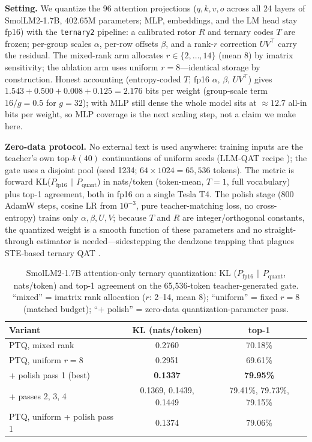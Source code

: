 \documentclass{article}
\begin{document}
\textbf{Setting.} We quantize the 96 attention projections ($q,k,v,o$
across all 24 layers of SmolLM2-1.7B, $402.65$M parameters; MLP,
embeddings, and the LM head stay fp16) with the \texttt{ternary2}
pipeline: a calibrated rotor $R$ and ternary codes $T$ are frozen;
per-group scales $\alpha$, per-row offsets $\beta$, and a rank-$r$
correction $UV^{\top}$ carry the residual. The mixed-rank arm allocates
$r\in\{2,\dots,14\}$ (mean $8$) by imatrix sensitivity; the ablation arm
uses uniform $r=8$---identical storage by construction. Honest
accounting (entropy-coded $T$; fp16 $\alpha$, $\beta$, $UV^{\top}$) gives
$1.543 + 0.500 + 0.008 + 0.125 = \mathbf{2.176}$ bits per weight
(group-scale term $16/g=0.5$ for $g{=}32$); with MLP still dense the
whole model sits at $\approx 12.7$ all-in bits per weight, so MLP
coverage is the next scaling step, not a claim we make here.

\textbf{Zero-data protocol.} No external text is used anywhere:
training inputs are the teacher's own top-$k(40)$ continuations of
uniform seeds (LLM-QAT recipe \citep{liu2024llmqat}); the gate uses a
disjoint pool (seed 1234; $64\times1024 = 65{,}536$ tokens). The metric
is forward KL($P_{\mathrm{fp16}}\|P_{\mathrm{quant}}$) in nats/token
(token-mean, $T{=}1$, full vocabulary) plus top-1 agreement, both in
fp16 on a single Tesla T4. The polish stage (800 AdamW steps, cosine LR
from $10^{-3}$, pure teacher-matching loss, no cross-entropy) trains
only $\alpha,\beta,U,V$; because $T$ and $R$ are integer/orthogonal
constants, the quantized weight is a smooth function of these
parameters and no straight-through estimator is needed---sidestepping
the deadzone trapping that plagues STE-based ternary QAT
\citep{huang2025tequila}.

\begin{table}[t]
\centering\small
\caption{SmolLM2-1.7B attention-only ternary quantization: KL
($P_{\mathrm{fp16}}\|P_{\mathrm{quant}}$, nats/token) and top-1 agreement
on the 65,536-token teacher-generated gate. ``mixed'' = imatrix rank
allocation ($r$: 2--14, mean 8); ``uniform'' = fixed $r=8$ (matched
budget); ``+ polish'' = zero-data quantization-parameter pass.}
\label{tab:klgate}
\begin{tabular}{lcc}
\toprule
Variant & KL (nats/token) & top-1 \\
\midrule
PTQ, mixed rank & 0.2760 & 70.18\% \\
PTQ, uniform $r{=}8$ & 0.2951 & 69.61\% \\
\quad + polish pass 1 (best) & \textbf{0.1337} & \textbf{79.95\%} \\
\quad + passes 2, 3, 4 & 0.1369, 0.1439, 0.1449 & 79.41\%, 79.73\%, 79.15\% \\
PTQ, uniform + polish pass 1 & 0.1374 & 79.06\% \\
\bottomrule
\end{tabular}
\end{table}
\end{document}
